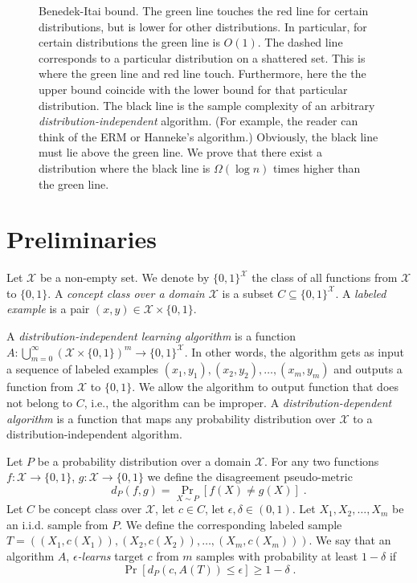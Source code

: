 \documentclass[10pt]{article}
\newcommand{\X}{\mathcal{X}}
\begin{document}
\begin{figure}
{Benedek-Itai bound. The green line touches the red line for certain
distributions, but is lower for other distributions. In particular, for certain
distributions the green line is $O(1)$. The dashed line corresponds
to a particular distribution on a shattered set. This is where the green line
and red line touch. Furthermore, here the the upper bound coincide
with the lower bound for that particular distribution.
The black line is the sample complexity
of an arbitrary \emph{distribution-independent} algorithm. (For example, the
reader can think of the ERM or Hanneke's algorithm.) Obviously, the black line
must lie above the green line. We prove that there exist a distribution where
the black line is $\Omega(\log n)$ times higher than the
green line.} \label{figure:sample-complexity}
\end{figure}

\section{Preliminaries}

Let $\X$ be a non-empty set. We denote by $\{0,1\}^\X$ the class of all
functions from $\X$ to $\{0,1\}$. A \emph{concept class over a domain $\X$} is a
subset $C \subseteq \{0,1\}^\X$. A \emph{labeled example} is a pair $(x,y) \in
\X \times \{0,1\}$.

A \emph{distribution-independent learning algorithm} is a function
$A:\bigcup_{m=0}^\infty \left(\X \times \{0,1\} \right)^m \to \{0,1\}^\X$. In
other words, the algorithm gets as input a sequence of labeled examples $(x_1,
y_1), (x_2, y_2), \dots, (x_m, y_m)$ and outputs a function from $\X$ to
$\{0,1\}$. We allow the algorithm to output function that does not belong to
$C$, i.e., the algorithm can be improper. A \emph{distribution-dependent algorithm}
is a function that maps any probability distribution over $\X$ to a
distribution-independent algorithm.

Let $P$ be a probability distribution over a domain $\X$. For any two functions
$f:\X \to \{0,1\}$, $g:\X \to \{0,1\}$ we define the disagreement pseudo-metric
$$
d_P(f,g) = \Pr_{X \sim P}[f(X) \neq g(X)] \; .
$$
Let $C$ be concept class over $\X$, let $c \in C$, let $\epsilon, \delta \in (0,1)$.
Let  $X_1, X_2, \dots, X_m$ be an i.i.d. sample from $P$. We define the corresponding
labeled sample $T = ((X_1, c(X_1)), (X_2, c(X_2)), \dots, (X_m, c(X_m)))$.
We say that an algorithm $A$, \emph{$\epsilon$-learns} target $c$ from $m$ samples
with probability at least $1 - \delta$ if
$$
\Pr \left[d_P(c,A(T)) \le \epsilon \right]  \ge 1 - \delta \; .
$$
\end{document}
